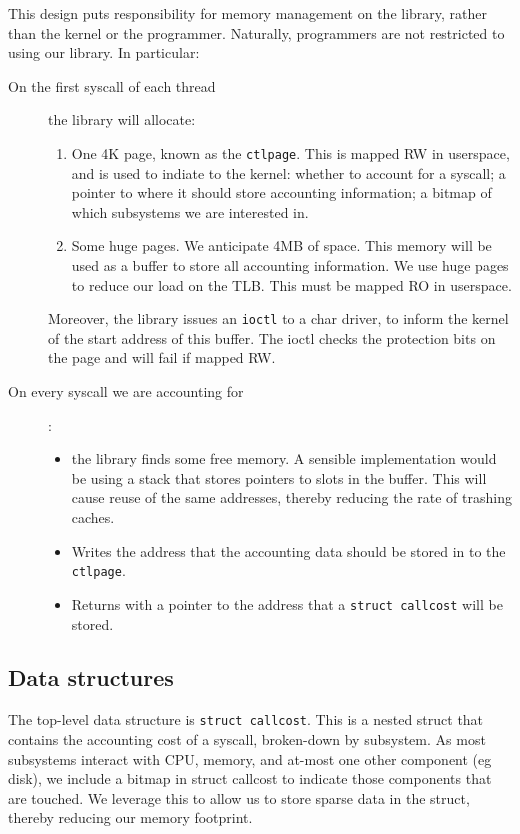 \documentclass[12pt]{article}
\def\_{\textunderscore\-}
\begin{document}
  This design puts responsibility for memory management on the library, rather than the kernel or the programmer. Naturally, programmers are not restricted to using our library. In particular:
  \begin{description}
  \item[On the first syscall of each thread] the library will allocate:
  \begin{enumerate}
  \item One 4K page, known as the \texttt{ctl\_page}.  This is mapped RW in userspace, and is used to indiate to the kernel: whether to account for a syscall; a pointer to where it should store accounting information; a bitmap of which subsystems we are interested in.
  \item Some huge pages. We anticipate 4MB of space. This memory will be used as a buffer to store all accounting information. We use huge pages to reduce our load on the TLB. This must be mapped RO in  userspace.
  \end{enumerate}
  Moreover, the library issues an \texttt{ioctl} to a char driver, to inform the kernel of the start address of this buffer. The ioctl checks the protection bits on the page and will fail if mapped RW.
  \item[On every syscall we are accounting for]:
  \begin{itemize}
  \item  the library finds some free memory. A sensible implementation would be using a stack that stores pointers to slots in the buffer. This will cause reuse of the same addresses, thereby reducing the rate of trashing caches.
  \item Writes the address that the accounting data should be stored in to the \texttt{ctl\_page}.
  \item Returns with a pointer to the address that a \texttt{struct call\_cost} will be stored.
  \end{itemize}
  \end{description}

  \subsection{Data structures}
  The top-level data structure is \texttt{struct call\_cost}. This is a nested struct that contains the accounting cost of a syscall, broken-down by subsystem. As most subsystems interact with CPU, memory, and at-most one other component (eg disk), we include a  bitmap  in struct call\_cost to indicate those components that are touched. We leverage this to allow us to store sparse data in the struct, thereby reducing our memory footprint.
\end{document}
